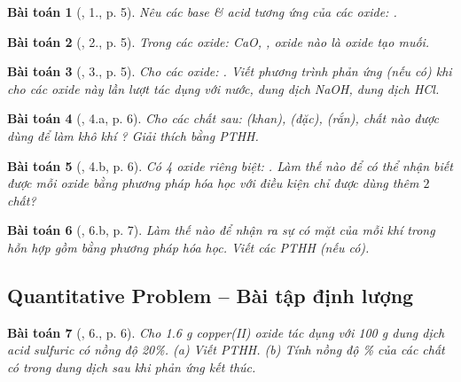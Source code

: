 \documentclass{article}
\newtheorem{baitoan}{Bài toán}
\begin{document}
\begin{baitoan}[\cite{An_350_BT_Hoa_Hoc_9}, 1., p. 5]
	Nêu các base \& acid tương ứng của các oxide: \emph{}.
\end{baitoan}

\begin{baitoan}[\cite{An_350_BT_Hoa_Hoc_9}, 2., p. 5]
	Trong các oxide: \emph{CaO, }, oxide nào là oxide tạo muối.
\end{baitoan}

\begin{baitoan}[\cite{An_350_BT_Hoa_Hoc_9}, 3., p. 5]
	Cho các oxide: \emph{}. Viết phương trình phản ứng (nếu có) khi cho các oxide này lần lượt tác dụng với nước, dung dịch \emph{NaOH}, dung dịch \emph{HCl}.
\end{baitoan}

\begin{baitoan}[\cite{An_350_BT_Hoa_Hoc_9}, 4.a, p. 6]
	Cho các chất sau: \emph{ (khan),  (đặc),  (rắn)}, chất nào được dùng để làm khô khí \emph{}? Giải thích bằng PTHH.
\end{baitoan}

\begin{baitoan}[\cite{An_350_BT_Hoa_Hoc_9}, 4.b, p. 6]
	Có 4 oxide riêng biệt: \emph{}. Làm thế nào để có thể nhận biết được mỗi oxide bằng phương pháp hóa học với điều kiện chỉ được dùng thêm $2$ chất?
\end{baitoan}

\begin{baitoan}[\cite{An_350_BT_Hoa_Hoc_9}, 6.b, p. 7]
	Làm thế nào để nhận ra sự có mặt của mỗi khí trong hỗn hợp gồm \emph{} bằng phương pháp hóa học. Viết các PTHH (nếu có).
\end{baitoan}

\subsection{Quantitative Problem -- Bài tập định lượng}

\begin{baitoan}[\cite{SGK_Hoa_Hoc_9}, 6., p. 6]
	Cho \emph{1.6 g} copper(II) oxide tác dụng với \emph{100 g} dung dịch acid sulfuric có nồng độ \emph{20\%}. (a) Viết PTHH. (b) Tính nồng độ \% của các chất có trong dung dịch sau khi phản ứng kết thúc.
\end{baitoan}
\end{document}
